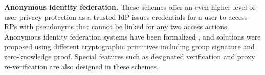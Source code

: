 \newc
\noindent\textbf{Anonymous identity federation.}
These schemes offer an even higher level of user privacy protection as a trusted IdP issues credentials for a user to access RPs with pseudonyms that cannot be linked for any two access actions.
\oldc
Anonymous identity federation systems have been formalized \cite{WangWS13},
 and solutions \cite{WangWS13, HanCSTW18, HanCSTWW20} were proposed using different cryptographic primitives including group signature and zero-knowledge proof. Special features such as designated verification \cite{HanCSTW18} and proxy re-verification \cite{HanCSTWW20} are also designed in these schemes.
